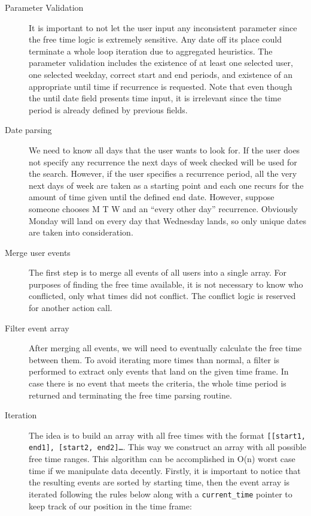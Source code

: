 \documentclass[11pt]{article}
\begin{document}
\begin{description}
 \item [Parameter Validation] It is important to not let the user input any inconsistent parameter since the free time logic is extremely sensitive. Any date off its place could terminate a whole loop iteration due to aggregated heuristics. The parameter validation includes the existence of at least one selected user, one selected weekday, correct start and end periods, and existence of an appropriate until time if recurrence is requested. Note that even though the until date field presents time input, it is irrelevant since the time period is already defined by previous fields.
\item[Date parsing] We need to know all days that the user wants to look for. If the user does not specify any recurrence the next days of week checked will be used for the search. However, if the user specifies a recurrence period, all the very next days of week are taken as a starting point and each one recurs for the amount of time given until the defined end date. However, suppose someone chooses M T W and an “every other day” recurrence. Obviously Monday will land on every day that Wednesday lands, so only unique dates are taken into consideration.  
\item[Merge user events] The first step is to merge all events of all users into a single array. For purposes of finding the free time available, it is not necessary to know who conflicted, only what times did not conflict. The conflict logic is reserved for another action call.
\item[Filter event array] After merging all events, we will need to eventually calculate the free time between them. To avoid iterating more times than normal, a filter is performed to extract only events that land on the given time frame. In case there is no event that meets the criteria, the whole time period is returned and terminating the free time parsing routine.
\item[Iteration] The idea is to build an array with all free times with the format \texttt{[[start1, end1], [start2, end2]…}.  This way we construct an array with all possible free time ranges. This algorithm can be accomplished in O(n) worst case time if we manipulate data decently. Firstly, it is important to notice that the resulting events are sorted by starting time, then the event array is iterated following the rules below along with a \texttt{current_time} pointer to keep track of our position in the time frame:
\begin{itemize}

\end{itemize}
\end{description}
\end{document}
